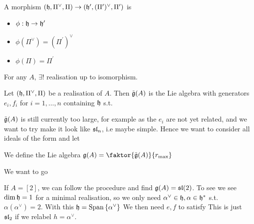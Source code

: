 \documentclass{article}
\begin{document}
\begin{definition}
A morphism $(\mathfrak{h},\Pi^\vee,\Pi) \to (\mathfrak{h}^\prime,(\Pi^\prime)^\vee,\Pi^\prime)$ is
\begin{itemize}
    \item $\phi : \mathfrak{h} \to \mathfrak{h}^\prime$ 
    \item $\phi(\Pi^\vee) = (\Pi^\prime)^\vee$
    \item $\phi(\Pi) = \Pi^\prime$
\end{itemize}
\end{definition}

\begin{prop}
For any $A$, $\exists!$ realisation up to isomorphism. 
\end{prop}

\begin{definition}
Let $(\mathfrak{h},\Pi^\vee,\Pi)$ be a realisation of $A$. Then $\tilde{\mathfrak{g}}(A)$ is the Lie algebra with generators $e_i,f_i$ for $i=1, \dots, n$ containing $\mathfrak{h}$ s.t. 
\end{definition}

\begin{idea}
$\tilde{\mathfrak{g}}(A)$ is still currently too large, for example as the $e_i$ are not yet related, and we want to try make it look like $\mathfrak{sl}_n$, i.e maybe simple. Hence we want to consider all ideals of the form 
and let 
\end{idea}

\begin{definition}
We define the Lie algebra $\mf{g}(A) = \faktor{\tilde{\mf{g}}(A)}{r_{\text{max}}}$
\end{definition}


\begin{idea}
We want to go 
\end{idea}

\begin{example}
If $A=[2]$, we can follow the procedure and find $\mathfrak{g}(A) = \mathfrak{sl}(2)$. To see we see $\dim\mathfrak{h}=1$ for a minimal realisation, so we only need $\alpha^\vee \in \mathfrak{h}, \alpha\in \mathfrak{h}^\ast$ s.t. $\alpha(\alpha^\vee)=2$. With this $\mathfrak{h} = \operatorname{Span}\left\{ \alpha^\vee \right\}$ We then need $e,f$ to satisfy 
This is just $\mathfrak{sl}_2$ if we relabel $h = \alpha^\vee$. 
\end{example}
\end{document}
